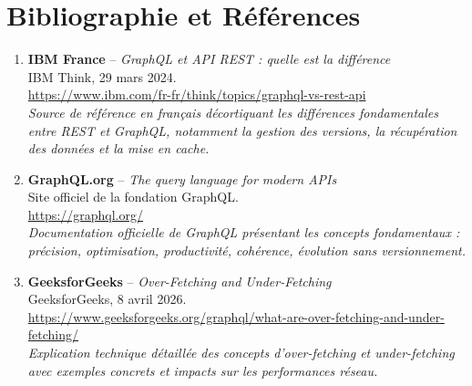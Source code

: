 \documentclass[12pt,a4paper]{article}
\begin{document}
\vfill
\newpage

\section*{Bibliographie et Références}

\begin{enumerate}[leftmargin=1.5cm]

    \item \textbf{IBM France} -- \textit{GraphQL et API REST : quelle est la différence} \\
    IBM Think, 29 mars 2024. \\
    \url{https://www.ibm.com/fr-fr/think/topics/graphql-vs-rest-api} \\
    \textit{Source de référence en français décortiquant les différences fondamentales entre REST et GraphQL, notamment la gestion des versions, la récupération des données et la mise en cache.}

    \item \textbf{GraphQL.org} -- \textit{The query language for modern APIs} \\
    Site officiel de la fondation GraphQL. \\
    \url{https://graphql.org/} \\
    \textit{Documentation officielle de GraphQL présentant les concepts fondamentaux : précision, optimisation, productivité, cohérence, évolution sans versionnement.}

    \item \textbf{GeeksforGeeks} -- \textit{Over-Fetching and Under-Fetching} \\
    GeeksforGeeks, 8 avril 2026. \\
    \url{https://www.geeksforgeeks.org/graphql/what-are-over-fetching-and-under-fetching/} \\
    \textit{Explication technique détaillée des concepts d'over-fetching et under-fetching avec exemples concrets et impacts sur les performances réseau.}

    

\end{enumerate}
\end{document}
